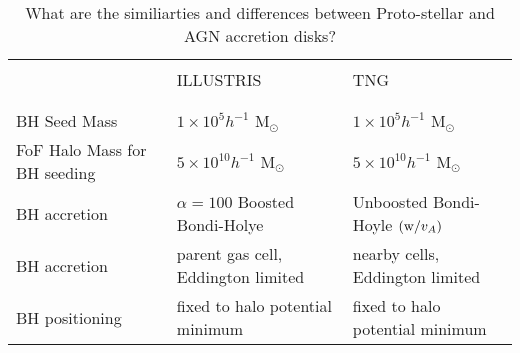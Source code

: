 \documentclass[11pt,a4paper]{article}
\begin{document}
\begin{landscape}
  \begin{table}[]
    \centering
    \label{my-label}
    \begin{tabular}{  p{65mm}   p{70mm}  p{70mm} }  %
      \hline
      \hline
      &                    &  \\
      & ILLUSTRIS    & TNG \\
                  &                     &  \\
      \hline
                  &                     &  \\
      BH Seed Mass                             &  $1\times10^{5} h^{-1}$ M$_{\odot}$ &   $1\times10^{5} h^{-1}$ M$_{\odot}$\\
      FoF Halo Mass for BH seeding    & $5\times10^{10} h^{-1}$ M$_{\odot}$ &   $5\times10^{10} h^{-1}$ M$_{\odot}$\\
      BH accretion & $\alpha=100$ Boosted Bondi-Holye   & Unboosted Bondi-Hoyle $({\rm w} / v_{A})$  \\
      BH accretion & parent gas cell, Eddington limited & nearby cells, Eddington limited  \\
      BH positioning & fixed to halo potential minimum & fixed to halo potential minimum \\
    \hline
    \hline
\end{tabular}
    \caption{What are the similiarties and differences between 
      Proto-stellar and AGN accretion disks?
    }
    \label{BH Feedback: BH seeding and accretion.  
BHs are usually placed by hand as``sink particles'':
they can grow in mass by `accreting' material from the surroundings
(Pillepich Edinburgh talk, 20171011).   }
\end{table}
\end{landscape}




\end{document}
